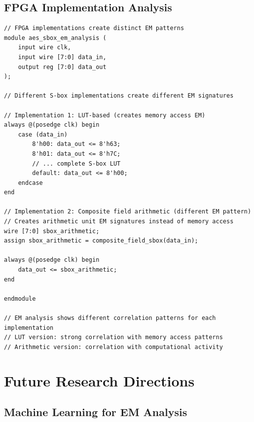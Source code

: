 \documentclass[11pt,a4paper]{article}
\theoremstyle{definition}
\begin{document}
\subsection{FPGA Implementation Analysis}

\begin{lstlisting}[caption={FPGA EM Signature Analysis}]
// FPGA implementations create distinct EM patterns
module aes_sbox_em_analysis (
    input wire clk,
    input wire [7:0] data_in,
    output reg [7:0] data_out
);

// Different S-box implementations create different EM signatures

// Implementation 1: LUT-based (creates memory access EM)
always @(posedge clk) begin
    case (data_in)
        8'h00: data_out <= 8'h63;
        8'h01: data_out <= 8'h7C;
        // ... complete S-box LUT
        default: data_out <= 8'h00;
    endcase
end

// Implementation 2: Composite field arithmetic (different EM pattern)
// Creates arithmetic unit EM signatures instead of memory access
wire [7:0] sbox_arithmetic;
assign sbox_arithmetic = composite_field_sbox(data_in);

always @(posedge clk) begin
    data_out <= sbox_arithmetic;
end

endmodule

// EM analysis shows different correlation patterns for each implementation
// LUT version: strong correlation with memory access patterns  
// Arithmetic version: correlation with computational activity
\end{lstlisting}

\section{Future Research Directions}

\subsection{Machine Learning for EM Analysis}
\end{document}
